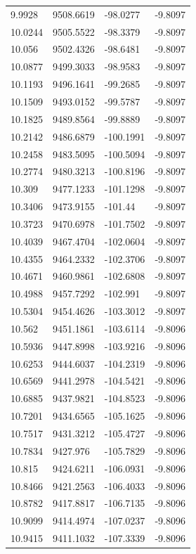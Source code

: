\begin{table}[H]
\begin{tabular}{llll}
9.9928 & 9508.6619 & -98.0277 & -9.8097 \\
10.0244 & 9505.5522 & -98.3379 & -9.8097 \\
10.056 & 9502.4326 & -98.6481 & -9.8097 \\
10.0877 & 9499.3033 & -98.9583 & -9.8097 \\
10.1193 & 9496.1641 & -99.2685 & -9.8097 \\
10.1509 & 9493.0152 & -99.5787 & -9.8097 \\
10.1825 & 9489.8564 & -99.8889 & -9.8097 \\
10.2142 & 9486.6879 & -100.1991 & -9.8097 \\
10.2458 & 9483.5095 & -100.5094 & -9.8097 \\
10.2774 & 9480.3213 & -100.8196 & -9.8097 \\
10.309 & 9477.1233 & -101.1298 & -9.8097 \\
10.3406 & 9473.9155 & -101.44 & -9.8097 \\
10.3723 & 9470.6978 & -101.7502 & -9.8097 \\
10.4039 & 9467.4704 & -102.0604 & -9.8097 \\
10.4355 & 9464.2332 & -102.3706 & -9.8097 \\
10.4671 & 9460.9861 & -102.6808 & -9.8097 \\
10.4988 & 9457.7292 & -102.991 & -9.8097 \\
10.5304 & 9454.4626 & -103.3012 & -9.8097 \\
10.562 & 9451.1861 & -103.6114 & -9.8096 \\
10.5936 & 9447.8998 & -103.9216 & -9.8096 \\
10.6253 & 9444.6037 & -104.2319 & -9.8096 \\
10.6569 & 9441.2978 & -104.5421 & -9.8096 \\
10.6885 & 9437.9821 & -104.8523 & -9.8096 \\
10.7201 & 9434.6565 & -105.1625 & -9.8096 \\
10.7517 & 9431.3212 & -105.4727 & -9.8096 \\
10.7834 & 9427.976 & -105.7829 & -9.8096 \\
10.815 & 9424.6211 & -106.0931 & -9.8096 \\
10.8466 & 9421.2563 & -106.4033 & -9.8096 \\
10.8782 & 9417.8817 & -106.7135 & -9.8096 \\
10.9099 & 9414.4974 & -107.0237 & -9.8096 \\
10.9415 & 9411.1032 & -107.3339 & -9.8096 \\

\end{tabular}
\end{table}
